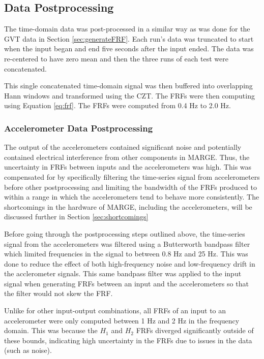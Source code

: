 \subsection{Data Postprocessing} %

The time-domain data was post-processed in a similar way as was done for the GVT data in Section \ref{sec:generateFRF}. Each run's data was truncated to start when the input began and end five seconds after the input ended. The data was re-centered to have zero mean and then the three runs of each test were concatenated.

This single concatenated time-domain signal was then buffered into overlapping Hann windows and transformed using the CZT. The FRFs were then computing using Equation \ref{eq:frf}. The FRFs were computed from 0.4 Hz to 2.0 Hz.

\subsubsection{Accelerometer Data Postprocessing} %

The output of the accelerometers contained significant noise and potentially contained electrical interference from other components in MARGE. Thus, the uncertainty in FRFs between inputs and the accelerometers was high. This was compensated for by specifically filtering the time-series signal from accelerometers before other postprocessing and limiting the bandwidth of the FRFs produced to within a range in which the accelerometers tend to behave more consistently. The shortcomings in the hardware of MARGE, including the accelerometers, will be discussed further in Section \ref{sec:shortcomings}

Before going through the postprocessing steps outlined above, the time-series signal from the accelerometers was filtered using a Butterworth bandpass filter which limited frequencies in the signal to between 0.8 Hz and 25 Hz. This was done to reduce the effect of both high-frequency noise and low-frequency drift in the acclerometer signals. This same bandpass filter was applied to the input signal when generating FRFs between an input and the accelerometers so that the filter would not skew the FRF.

Unlike for other input-output combinations, all FRFs of an input to an accelerometer were only computed between 1 Hz and 2 Hz in the frequency domain. This was because the $H_1$ and $H_2$ FRFs diverged significantly outside of these bounds, indicating high uncertainty in the FRFs due to issues in the data (such as noise).

